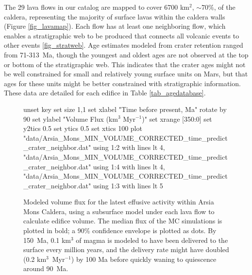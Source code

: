 The 29 lava flows in our catalog are mapped to cover 6700 km$^2$, $\sim$70\%, of the caldera, representing the majority of surface lavas within the caldera walls (Figure \ref{fig_lavamap}). Each flow has at least one neighboring flow, which enables a stratigraphic web to be produced that connects all volcanic events to other events \ref{fig_stratweb}. Age estimates modeled from crater retention ranged from 71-313~Ma, though the youngest and oldest ages are not observed at the top or bottom of the stratigraphic web. This indicates that the crater ages might not be well constrained for small and relatively young surface units on Mars, but that ages for these units might be better constrained with stratigraphic information. These data are detailed for each edifice in Table \ref{tab_agedatabase}.
	
	\begin{figure}[ht]
		\centering
		\begin{gnuplot}[terminal=latex, terminaloptions=rotate]
			unset key
			set size 1,1
			set xlabel "Time before present, Ma" rotate by 90
			set ylabel "Volume Flux (km$^3$ Myr$^{-1}$)"
			set xrange [350:0]
			set y2tics 0.5
			set ytics 0.5
			set xtics 100
			plot "data/Arsia_Mons_MIN_VOLUME_CORRECTED_time_predict_crater_neighbor.dat" using 1:2 with lines lt 4, "data/Arsia_Mons_MIN_VOLUME_CORRECTED_time_predict_crater_neighbor.dat" using 1:4 with lines lt 4, "data/Arsia_Mons_MIN_VOLUME_CORRECTED_time_predict_crater_neighbor.dat" using 1:3 with lines lt 5
		\end{gnuplot}
		\caption[Modeled volume flux for the latest effusive activity within Arsia Mons Caldera, using a subsurface model under each lava flow to calculate edifice volume]{Modeled volume flux for the latest effusive activity within Arsia Mons Caldera, using a subsurface model under each lava flow to calculate edifice volume. The median flux of the MC simulations is plotted in bold; a 90\% confidence envelope is plotted as dots. By 150~Ma, 0.1 km$^3$ of magma is modeled to have been delivered to the surface every million years, and the delivery rate might have doubled (0.2 km$^3$~Myr$^{-1}$) by 100 Ma before quickly waning to quiescence around 90~Ma.}
		\label{fig_VERRMMINVOL}
	\end{figure}
